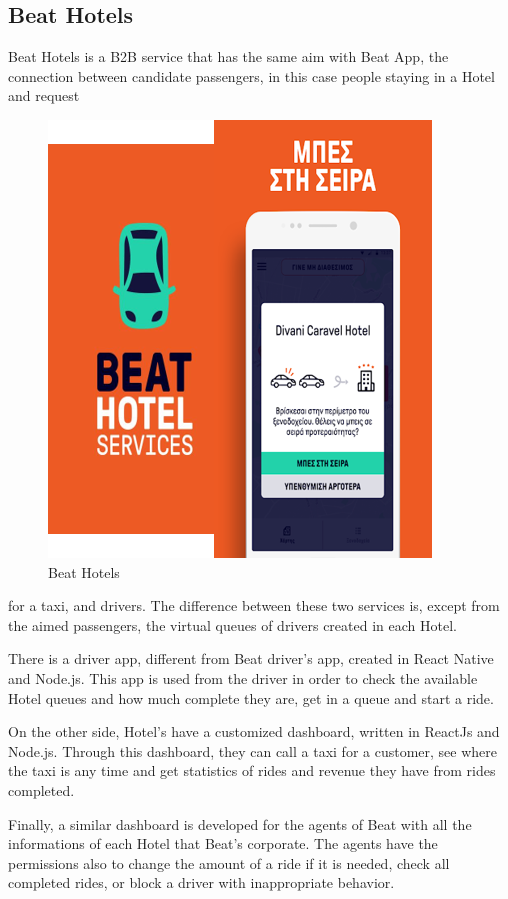 \subsection{Beat Hotels}
Beat Hotels is a B2B service that has the same aim with Beat App, the connection between candidate passengers, in this case people staying in a Hotel and request 
\begin{figure}
	\begin{center}
		\includegraphics[scale=0.5]{images/beat_hotels.png}
	\end{center}
	\caption{Beat Hotels}
\end{figure}
for a taxi, and drivers.
The difference between these two services is, except from the aimed passengers, the virtual queues of drivers created in each Hotel.\par
There is a driver app, different from Beat driver's app, created in React Native and Node.js. This app is used from the driver in order to check the available Hotel queues and how much complete they are, get in a queue and start a ride.\par
On the other side, Hotel's have a customized dashboard, written in ReactJs and Node.js. Through this dashboard, they can call a taxi for a customer, see where the taxi is any time and get statistics of rides and revenue they have from rides completed.\par
Finally, a similar dashboard is developed for the agents of Beat with all the informations of each Hotel that Beat's corporate. The agents have the permissions also to change the amount of a ride if it is needed, check all completed rides, or block a driver with inappropriate behavior.

